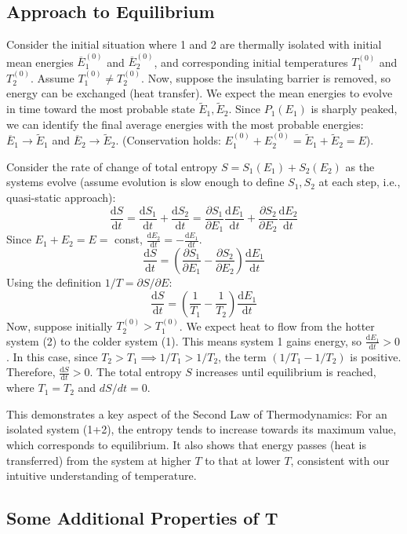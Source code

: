 \documentclass[11pt]{article}
\newcommand{\avg}[1]{\overline{#1}}
\newcommand{\pderiv}[2]{\frac{\partial #1}{\partial #2}}
\newcommand{\deriv}[2]{\frac{\mathrm{d} #1}{\mathrm{d} #2}}
\begin{document}
\subsection*{Approach to Equilibrium}

Consider the initial situation where 1 and 2 are thermally isolated with initial mean energies $\avg{E}_1^{(0)}$ and $\avg{E}_2^{(0)}$, and corresponding initial temperatures $T_1^{(0)}$ and $T_2^{(0)}$. Assume $T_1^{(0)} \neq T_2^{(0)}$.
Now, suppose the insulating barrier is removed, so energy can be exchanged (heat transfer).
We expect the mean energies to evolve in time toward the most probable state $\tilde{E}_1, \tilde{E}_2$. Since $P_1(E_1)$ is sharply peaked, we can identify the final average energies with the most probable energies: $\avg{E}_1 \to \tilde{E}_1$ and $\avg{E}_2 \to \tilde{E}_2$. (Conservation holds: $E_1^{(0)}+E_2^{(0)} = \tilde{E}_1+\tilde{E}_2 = E$).

Consider the rate of change of total entropy $S = S_1(E_1) + S_2(E_2)$ as the systems evolve (assume evolution is slow enough to define $S_1, S_2$ at each step, i.e., quasi-static approach):
\[ \deriv{S}{t} = \deriv{S_1}{t} + \deriv{S_2}{t} = \pderiv{S_1}{E_1} \deriv{E_1}{t} + \pderiv{S_2}{E_2} \deriv{E_2}{t} \]
Since $E_1+E_2=E=$ const, $\deriv{E_2}{t} = -\deriv{E_1}{t}$.
\[ \deriv{S}{t} = \left( \pderiv{S_1}{E_1} - \pderiv{S_2}{E_2} \right) \deriv{E_1}{t} \]
Using the definition $1/T = \partial S / \partial E$:
\[ \deriv{S}{t} = \left( \frac{1}{T_1} - \frac{1}{T_2} \right) \deriv{E_1}{t} \]
Now, suppose initially $T_2^{(0)} > T_1^{(0)}$. We expect heat to flow from the hotter system (2) to the colder system (1). This means system 1 gains energy, so $\deriv{E_1}{t} > 0$.
In this case, since $T_2 > T_1 \implies 1/T_1 > 1/T_2$, the term $(1/T_1 - 1/T_2)$ is positive.
Therefore, $\deriv{S}{t} > 0$.
The total entropy $S$ increases until equilibrium is reached, where $T_1=T_2$ and $dS/dt=0$.

This demonstrates a key aspect of the Second Law of Thermodynamics: For an isolated system (1+2), the entropy tends to increase towards its maximum value, which corresponds to equilibrium. It also shows that energy passes (heat is transferred) from the system at higher $T$ to that at lower $T$, consistent with our intuitive understanding of temperature.

\subsection*{Some Additional Properties of T}
\end{document}
